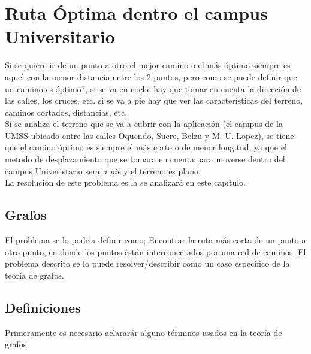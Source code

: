 \section{Ruta Óptima dentro el campus Universitario} %
\label{sec:ruta_optima}


Si se quiere ir de un punto a otro el mejor camino o el más óptimo siempre es aquel con la menor distancia entre los 2 puntos, pero como se puede definir que un camino es óptimo?, si se va en coche hay que tomar en cuenta la dirección de las calles, los cruces, etc. si se va a pie hay que ver las características del terreno, caminos cortados, distancias, etc.\\


Si se analiza el terreno que se va a cubrir con la aplicación (el campus de la UMSS ubicado entre las calles Oquendo, Sucre,  Belzu y M. U. Lopez), se tiene que el camino óptimo es siempre el más corto o de menor longitud, ya que el metodo de desplazamiento que se tomara en cuenta para moverse dentro del campus Univeristario sera \emph{a pie} y el terreno es plano.\\


La resolución de este problema es la se analizará en este capítulo.


  \subsection{Grafos} %
  \label{sub:teoria_grafos}

    El problema se lo podria definir como; Encontrar la ruta más corta de un punto a otro punto, en donde los puntos están interconectados por una red de caminos. El problema descrito se lo puede resolver/describir como un caso espec\'ifico de la teoría de grafos.


    \subsection{Definiciones} %
    \label{sub:grafos_definiciones}
      Primeramente es necesario aclarar\'ar alguno términos usados en la teoría de grafos.\\



